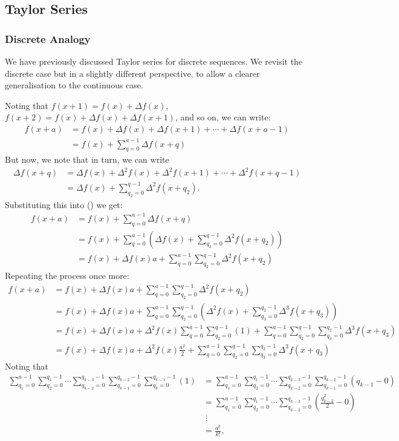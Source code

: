 \documentclass{article}
\theoremstyle{definition}
\begin{document}
\subsection{Taylor Series}
\subsubsection{Discrete Analogy}
We have previously discussed Taylor series for discrete sequences. We revisit the discrete case but in a slightly different perspective, to allow a clearer generalisation to the continuous case.\par
Noting that $f(x+1)=f(x)+\Delta f(x)$, $f(x+2)=f(x)+\Delta f(x)+\Delta f(x+1)$, and so on, we can write:
\begin{align*}
	f(x+a)&=f(x)+\Delta f(x)+\Delta f(x+1)+\cdots+\Delta f(x+a-1)\\
	&=f(x)+\sum_{q=0}^{a-1}\Delta f(x+q)
\end{align*}
But now, we note that in turn, we can write 
\begin{align*}
	\Delta f(x+q)&=\Delta f(x)+\Delta^2f(x)+\Delta^2f(x+1)+\cdots+\Delta^2f(x+q-1)\\
	&=\Delta f(x)+\sum_{q_2=0}^{q-1}\Delta^2f(x+q_2).
\end{align*}
Substituting this into () we get:
\begin{align*}
	f(x+a)&=f(x)+\sum_{q=0}^{a-1}\Delta f(x+q)\\
	&=f(x)+\sum_{q=0}^{a-1}\left(\Delta f(x)+\sum_{q_2=0}^{q-1}\Delta^2f(x+q_2)\right)\\
	&=f(x)+\Delta f(x)a+\sum_{q=0}^{a-1}\sum_{q_2=0}^{q-1}\Delta^2f(x+q_2)
\end{align*}
Repeating the process once more:
\begin{align*}
	f(x+a)&=f(x)+\Delta f(x)a+\sum_{q=0}^{a-1}\sum_{q_2=0}^{q-1}\Delta^2f(x+q_2)\\
	&=f(x)+\Delta f(x)a+\sum_{q=0}^{a-1}\sum_{q_2=0}^{q-1}\left(\Delta^2f(x)+\sum_{q_3=0}^{q_2-1}\Delta^3f(x+q_3)\right)\\
	&=f(x)+\Delta f(x)a+\Delta^2f(x)\sum_{q=0}^{a-1}\sum_{q_2=0}^{q-1}(1)+\sum_{q=0}^{a-1}\sum_{q_2=0}^{q-1}\sum_{q_3=0}^{q_2-1}\Delta^3f(x+q_3)\\
	&=f(x)+\Delta f(x)a+\Delta^2f(x)\frac{a^{\underline{2}}}{2}+\sum_{q=0}^{a-1}\sum_{q_2=0}^{q-1}\sum_{q_3=0}^{q_2-1}\Delta^3f(x+q_3)
\end{align*}
Noting that 
\begin{align*}
	\sum_{q_1=0}^{a-1}\sum_{q_2=0}^{q_1-1}\cdots\sum_{q_{k-2}=0}^{q_{k-3}-1}\sum_{q_{k-1}=0}^{q_{k-2}-1}\sum_{q_k=0}^{q_{k-1}-1}(1)&=\sum_{q_1=0}^{a-1}\sum_{q_2=0}^{q_1-1}\cdots\sum_{q_{k-2}=0}^{q_{k-3}-1}\sum_{q_{k-1}=0}^{q_{k-2}-1}(q_{k-1}-0)\\
	&=\sum_{q_1=0}^{a-1}\sum_{q_2=0}^{q_1-1}\cdots\sum_{q_{k-2}=0}^{q_{k-3}-1}(\frac{q_{k-2}^{\underline{2}}}{2}-0)\\
	&\;\vdots\\
	&=\frac{a^{\underline{k}}}{k!},
\end{align*}
\end{document}
